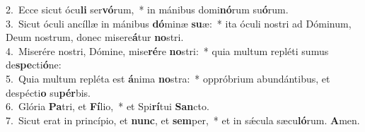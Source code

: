 {2.~}Ecce sicut ócu\textbf{li} ser\textbf{vó}rum,~* in mánibus domi\textbf{nó}rum su\textbf{ó}rum.\\
{3.~}Sicut óculi ancíllæ in mánibus \textbf{dó}minæ \textbf{su}æ:~* ita óculi nostri ad Dóminum, Deum nostrum, donec misere\textbf{á}tur \textbf{no}stri.\\
{4.~}Miserére nostri, Dómine, mise\textbf{ré}re \textbf{no}stri:~* quia multum repléti sumus de\textbf{spe}cti\textbf{ó}ne:\\
{5.~}Quia multum repléta est \textbf{á}nima \textbf{no}stra:~* oppróbrium abundántibus, et despécti\textbf{o} su\textbf{pér}bis.\\
{6.~}Glória \textbf{Pa}tri, et \textbf{Fí}lio,~* et Spi\textbf{rí}tui \textbf{San}cto.\\
{7.~}Sicut erat in princípio, et \textbf{nunc}, et \textbf{sem}per,~* et in sǽcula sæcu\textbf{ló}rum. \textbf{A}men.\\
